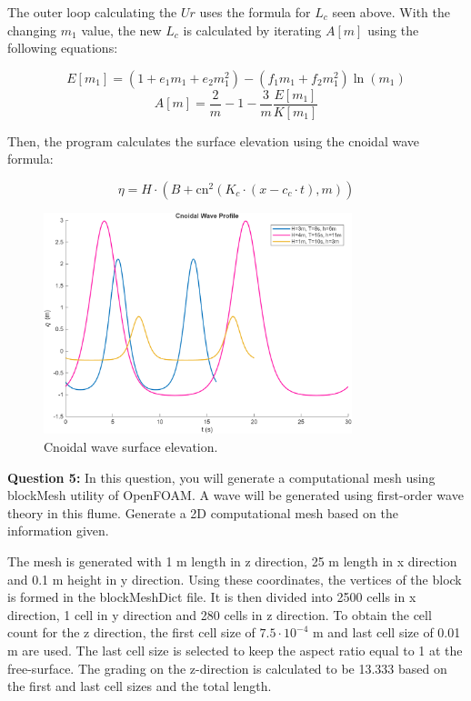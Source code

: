 \documentclass[a4paper]{article}
\begin{document}
The outer loop calculating the \(Ur\) uses the formula for \(L_c\) seen above. With the changing \(m_1\) value, the new \(L_c\) is calculated by iterating \(A[m]\) using the following equations:

\[E[m_1] = \left(1 + e_1 m_1 + e_2 m_1^2\right) - \left(f_1 m_1 + f_2 m_1^2\right) \ln(m_1)\]
\[A[m] = \frac{2}{m} - 1 - \frac{3}{m} \frac{E[m_1]}{K[m_1]}\]
\vspace{0.3cm}

Then, the program calculates the surface elevation using the cnoidal wave formula:

\[\eta = H \cdot \left(B + \text{cn}^2\left(K_c \cdot (x - c_c \cdot t), m\right)\right)\]

\begin{figure}[H]
    \centering
    \includegraphics[width=0.8\textwidth]{CE591HW1-Q4.png}
    \caption{\small Cnoidal wave surface elevation.}
    \label{fig:plot4}
\end{figure} 
\vspace{0.3cm}

\textbf{Question 5:} In this question, you will generate a computational mesh using blockMesh utility of OpenFOAM. A wave will be generated using first-order wave theory in this flume. Generate a 2D computational mesh based on the information given.
\vspace{0.3cm}

The mesh is generated with 1 m length in z direction, 25 m length in x direction and 0.1 m height in y direction. Using these coordinates, the vertices of the block is formed in the blockMeshDict file. It is then divided into 2500 cells in x direction, 1 cell in y direction and 280 cells in z direction. To obtain the cell count for the z direction, the first cell size of $7.5 \cdot 10^{-4}$ m and last cell size of 0.01 m are used. The last cell size is selected to keep the aspect ratio equal to 1 at the free-surface. The grading on the z-direction is calculated to be 13.333 based on the first and last cell sizes and the total length.
\end{document}
